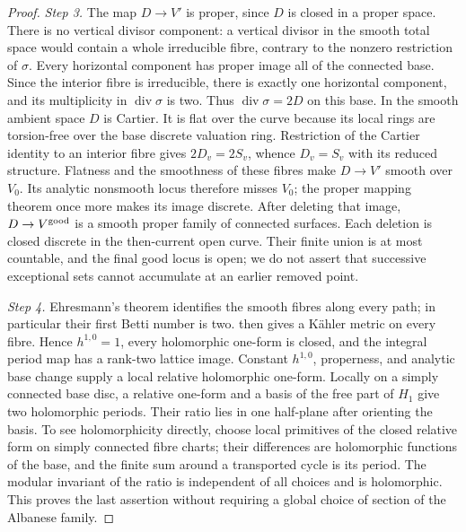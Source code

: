 \begin{proof}
\par\noindent\textit{Step 3.} The map \(D\to V'\) is proper, since \(D\) is closed in a proper
space. There is no vertical divisor component: a vertical divisor in
the smooth total space would contain a whole irreducible fibre,
contrary to the nonzero restriction of \(\sigma\). Every horizontal
component has proper image all of the connected base. Since the
interior fibre is irreducible, there is exactly one horizontal
component, and its multiplicity in \(\operatorname{div}\sigma\) is
two. Thus \(\operatorname{div}\sigma=2D\) on this base. In the smooth
ambient space \(D\) is Cartier. It is flat over the curve because
its local rings are torsion-free over the base discrete valuation
ring. Restriction of the Cartier identity to an interior fibre gives
\(2D_v=2S_v\), whence \(D_v=S_v\) with its reduced structure.
Flatness and the smoothness of these fibres make \(D\to V'\) smooth
over \(V_0\). Its analytic nonsmooth locus therefore misses \(V_0\);
the proper mapping theorem once more makes its image discrete.
After deleting that image, \(D\to V^{\rm good}\) is a smooth proper
family of connected surfaces. Each deletion is closed discrete in the
then-current open curve. Their finite union is at most countable,
and the final good locus is open; we do not assert that successive
exceptional sets cannot accumulate at an earlier removed point.

\par\noindent\textit{Step 4.} Ehresmann's theorem \cite[\S1, Proposition, pp.~154--155]{Ehresmann52} identifies the smooth fibres along every path;
in particular their first Betti number is two. \cite[Theorem~11]{Buchdahl1999} then gives a K\"ahler metric on every fibre. Hence
\(h^{1,0}=1\), every holomorphic one-form is closed, and the integral
period map has a rank-two lattice image. Constant \(h^{1,0}\),
properness, and analytic base change supply a local relative
holomorphic one-form. Locally on a simply connected
base disc, a relative one-form and a basis of the free part of
\(H_1\) give two holomorphic periods. Their ratio lies in one
half-plane after orienting the basis. To see holomorphicity directly,
choose local primitives of the closed relative form on simply
connected fibre charts; their differences are holomorphic functions
of the base, and the finite sum around a transported cycle is its
period. The modular invariant of the ratio is independent of all
choices and is holomorphic. This proves the last assertion without
requiring a global choice of section of the Albanese family.
\end{proof}

